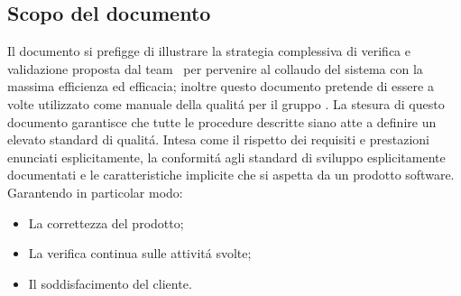 \subsection{Scopo del documento}
Il documento si prefigge di illustrare la strategia complessiva di verifica e validazione proposta dal team \gruppo ~per pervenire al collaudo del sistema con la massima efficienza ed efficacia; inoltre questo documento pretende di essere a volte utilizzato come manuale della qualit\'a per il gruppo \gruppo. La stesura di questo documento garantisce che tutte le procedure descritte siano atte a definire un elevato standard di qualit\'a. Intesa come il rispetto dei requisiti e prestazioni enunciati esplicitamente, la conformit\'a agli standard di sviluppo esplicitamente documentati e le caratteristiche implicite che si aspetta da un prodotto software. Garantendo in particolar modo:
\begin{itemize}
\item La correttezza del prodotto;
\item La verifica continua sulle attivit\'a svolte;
\item Il soddisfacimento del cliente.
\end{itemize}


